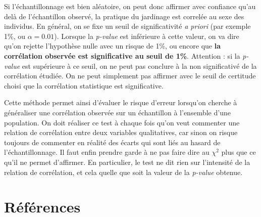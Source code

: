 \documentclass[
]{book}
\begin{document}
Si l'échantillonnage est bien aléatoire, on peut donc affirmer avec confiance qu'au delà de l'échantillon observé, la pratique du jardinage est correlée au sexe des individus. En général, on se fixe un seuil de significativité \emph{a priori} (par exemple 1\%, ou \(\alpha = 0.01\)). Lorsque la \emph{p-value} est inférieure à cette valeur, on va dire qu'on rejette l'hypothèse nulle avec un risque de 1\%, ou encore que \textbf{la corrélation observée est significative au seuil de 1\%}. Attention : si la \emph{p-value} est supérieure à ce seuil, on ne peut pas conclure à la non significativé de la corrélation étudiée. On ne peut simplement pas affirmer avec le seuil de certitude choisi que la corrélation statistique est significative.

Cette méthode permet ainsi d'évaluer le risque d'erreur lorsqu'on cherche à généraliser une corrélation observée sur un échantillon à l'ensemble d'une population. On doit réaliser ce test à chaque fois qu'on veut commenter une relation de corrélation entre deux variables qualitatives, car sinon on risque toujours de commenter en réalité des écarts qui sont liés au hasard de l'échantillonnage. Il faut enfin prendre garde à ne pas faire dire au \(\chi^2\) plus que ce qu'il ne permet d'affirmer. En particulier, le test ne dit rien sur l'intensité de la relation de corrélation, et cela quelle que soit la valeur de la \emph{p-value} obtenue.

\hypertarget{ruxe9fuxe9rences}{%
\chapter*{Références}\label{ruxe9fuxe9rences}}

  
\end{document}
